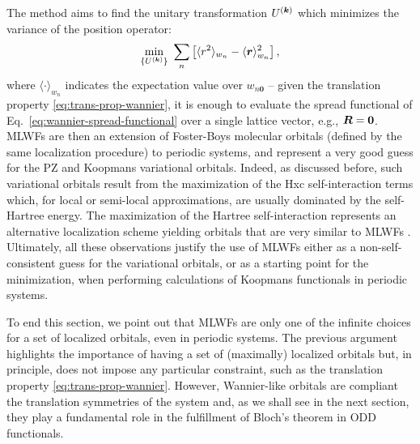 The method aims to find the unitary transformation $U^{({\bm k})}$ which minimizes the variance of the position operator:
%
\begin{equation}
    \min_{\{ U^{({\bm k})} \}} \ \sum_n \left[ \langle r^2 \rangle_{w_n} - \langle {\bm r} \rangle_{w_n}^2 \right] ,
    \label{eq:wannier-spread-functional}
\end{equation}
%
where $\langle \cdot \rangle_{w_n}$ indicates the expectation value over $w_{n{\bm 0}}$ -- given the translation property \eqref{eq:trans-prop-wannier}, it is enough to evaluate the spread functional of Eq.~\eqref{eq:wannier-spread-functional} over a single lattice vector, e.g., ${\bm R} = \bm 0$. MLWFs are then an extension of Foster-Boys molecular orbitals (defined by the same localization procedure) \cite{boys_construction_1960,foster_canonical_1960} to periodic systems, and represent a very good guess for the PZ and Koopmans variational orbitals. Indeed, as discussed before, such variational orbitals result from the maximization of the Hxc self-interaction terms which, for local or semi-local approximations, are usually dominated by the self-Hartree energy. The maximization of the Hartree self-interaction represents an alternative localization scheme yielding orbitals that are very similar to MLWFs \cite{marzari_maximally_2012}. Ultimately, all these observations justify the use of MLWFs either as a non-self-consistent guess for the variational orbitals, or as a starting point for the minimization, when performing calculations of Koopmans functionals in periodic systems.

To end this section, we point out that MLWFs are only one of the infinite choices for a set of localized orbitals, even in periodic systems. The previous argument highlights the importance of having a set of (maximally) localized orbitals but, in principle, does not impose any particular constraint, such as the translation property \eqref{eq:trans-prop-wannier}. However, Wannier-like orbitals are compliant the translation symmetries of the system and, as we shall see in the next section, they play a fundamental role in the fulfillment of Bloch's theorem in ODD functionals.

